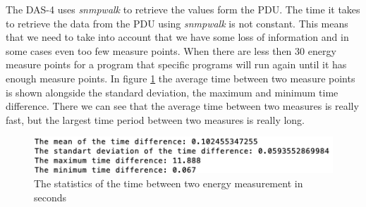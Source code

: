 The DAS-4 uses \textit{snmpwalk} to retrieve the values form the PDU. The time it takes to retrieve the data from the PDU using \textit{snmpwalk} is not constant. This means that we need to take into account that we have some loss of information and in some cases even too few measure points. When there are less then 30 energy measure points for a program that specific programs will run again until it has enough measure points. In figure \ref{fig:time_diff} the average time between two measure points is shown alongside the standard deviation, the maximum and minimum time difference. There we can see that the average time between two measures is really fast, but the largest time period between two measures is really long. 

\begin{figure}[h]
    \centering
    \includegraphics[width=.6\textwidth]{graphs/time_between_measures.png}
    \caption{The statistics of the time between two energy measurement in seconds}
    \label{fig:time_diff}
\end{figure}

